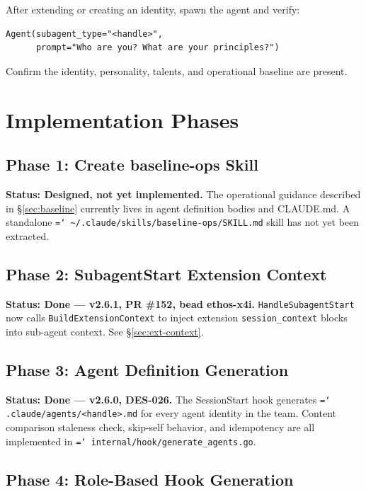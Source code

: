 \documentclass[a4paper,10pt]{article}
\newcommand{\fpath}[1]{\texttt{\hyphenchar\font=`\/ #1}}
\newcommand{\field}[1]{\texttt{#1}}
\newcommand{\cmd}[1]{\texttt{#1}}
\begin{document}
After extending or creating an identity, spawn the agent and verify:

\begin{lstlisting}
Agent(subagent_type="<handle>",
      prompt="Who are you? What are your principles?")
\end{lstlisting}

Confirm the identity, personality, talents, and operational baseline
are present.

\section{Implementation Phases}
\label{sec:phases}

\subsection{Phase 1: Create baseline-ops Skill}
\label{sec:phase1}

\textbf{Status: Designed, not yet implemented.} The operational
guidance described in \S\ref{sec:baseline} currently lives in agent
definition bodies and CLAUDE.md. A standalone
\fpath{\~{}/.claude/skills/baseline-ops/SKILL.md} skill has not yet
been extracted.

\subsection{Phase 2: SubagentStart Extension Context}
\label{sec:phase2}

\textbf{Status: Done --- v2.6.1, PR \#152, bead ethos-x4i.}
\cmd{HandleSubagentStart} now calls \cmd{BuildExtensionContext} to
inject extension \field{session\_context} blocks into sub-agent
context. See \S\ref{sec:ext-context}.

\subsection{Phase 3: Agent Definition Generation}
\label{sec:phase3}

\textbf{Status: Done --- v2.6.0, DES-026.} The SessionStart hook
generates \fpath{.claude/agents/<handle>.md} for every agent
identity in the team. Content comparison staleness check, skip-self
behavior, and idempotency are all implemented in
\fpath{internal/hook/generate\_agents.go}.

\subsection{Phase 4: Role-Based Hook Generation}
\label{sec:phase4}
\end{document}
